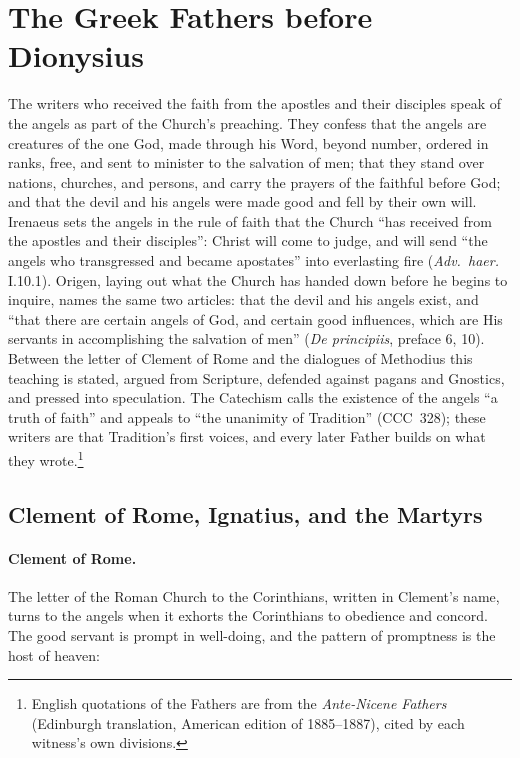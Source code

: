 \section{The Greek Fathers before Dionysius}\label{sec:fathers-before}

The writers who received the faith from the apostles and their disciples
speak of the angels as part of the Church's preaching. They confess that
the angels are creatures of the one God, made through his Word, beyond
number, ordered in ranks, free, and sent to minister to the salvation of
men; that they stand over nations, churches, and persons, and carry the
prayers of the faithful before God; and that the devil and his angels were
made good and fell by their own will. Irenaeus sets the angels in the rule
of faith that the Church ``has received from the apostles and their
disciples'': Christ will come to judge, and will send ``the angels who
transgressed and became apostates'' into everlasting fire (\emph{Adv.\
haer.} I.10.1). Origen, laying out what the Church has handed down before
he begins to inquire, names the same two articles: that the devil and his
angels exist, and ``that there are certain angels of God, and certain good
influences, which are His servants in accomplishing the salvation of men''
(\emph{De principiis}, preface 6, 10). Between the letter of Clement of
Rome and the dialogues of Methodius this teaching is stated, argued from
Scripture, defended against pagans and Gnostics, and pressed into
speculation. The Catechism calls the existence of the angels ``a truth of
faith'' and appeals to ``the unanimity of Tradition'' (CCC~328); these
writers are that Tradition's first voices, and every later Father builds on
what they wrote.\footnote{English quotations of the Fathers are from the
\emph{Ante-Nicene Fathers} (Edinburgh translation, American edition of
1885--1887), cited by each witness's own divisions.}

\sectionguard
\subsection{Clement of Rome, Ignatius, and the Martyrs}

\paragraph{Clement of Rome.} The letter of the Roman Church to the
Corinthians, written in Clement's name, turns to the angels when it
exhorts the Corinthians to obedience and concord. The good servant is
prompt in well-doing, and the pattern of promptness is the host of heaven:

